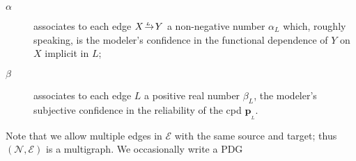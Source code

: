 \documentclass[letterpaper]{article} %
\theoremstyle{plain}
\theoremstyle{definition}
\theoremstyle{remark}
\newcommand{\notation}[1]{{\color{notationcolor} #1}}
\renewcommand{\notation}[1]{\ignorespaces} %
\newcommand\mat[1]{\mathbf{#1}}
\newcommand{\bp}[1][L]{\mat{p}_{\!_{#1}\!}}
\newcommand{\V}{\mathcal V}
\newcommand{\N}{\mathcal N}
\newcommand{\Ed}{\mathcal E}
\newcommand{\dg}[1]{\mathbdcal{#1}}
\newcommand{\Gr}{\mathcal G}
\newcommand{\ed}[3]{#2\!%
  \overset{\smash{\mskip-5mu\raisebox{-1pt}{$\scriptscriptstyle
        #1$}}}{\rightarrow}\! #3}
\begin{document}
\begin{defn}
\begin{description}
\item[$\alpha$] \notation{$:\Ed \to [0,1]$}
%
%
associates to each edge $\ed LXY$ a non-negative number $\alpha_L$ which,
roughly speaking, is the modeler's confidence in the functional
dependence of $Y$ on $X$ implicit in $L$; 
\item[$\beta$] \notation{$:\Ed \to \mathbb R^+$}
associates to each edge $L$ a positive real number $\beta_L$,
the modeler's 
subjective confidence in the reliability of
the cpd $\bp$. 
\end{description}
Note that we allow multiple edges in $\Ed$ with the same source and
target; thus $(\N,\Ed)$ is a multigraph.  We occasionally write a PDG

\end{defn}
\end{document}
